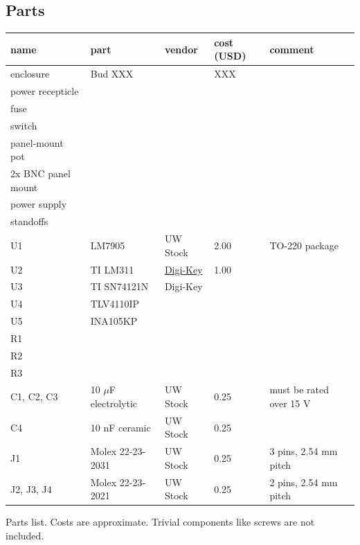 \documentclass{manual}
\begin{document}
\clearpage
\subsection{Parts}

\begin{table}[h]
\begin{tabular}{ l | l | l | l | l }
  name & part & vendor & cost (USD) & comment \\ \hline
  enclosure & Bud XXX & & XXX & \\
  power recepticle & & & & \\
  fuse & & & & \\
  switch & & & & \\
  panel-mount pot & & & & \\
  2x BNC panel mount & & & & \\ \hline
  power supply & & & & \\
  standoffs & & & & \\ \hline
  U1 & LM7905 & UW Stock & 2.00 & TO-220 package \\
  U2 & TI LM311 & \href{https://www.digikey.com/product-detail/en/texas-instruments/LM311N-NOPB/LM311NNS-NOPB-ND/6175}{Digi-Key} & 1.00 & \\
  U3 & TI SN74121N & Digi-Key & & \\
  U4 & TLV4110IP & & & \\
  U5 & INA105KP & & & \\ \hline
  R1 & & & \\
  R2 & & & \\
  R3 & & & \\ \hline
  C1, C2, C3 & 10 $\mu$F electrolytic & UW Stock & 0.25 & must be rated over 15 V\\
  C4 & 10 nF ceramic & UW Stock & 0.25 & \\ \hline
  J1 & Molex 22-23-2031 & UW Stock & 0.25 & 3 pins, 2.54 mm pitch \\
  J2, J3, J4 & Molex 22-23-2021 & UW Stock & 0.25 & 2 pins, 2.54 mm pitch \\
\end{tabular}
\end{table}

Parts list.
Costs are approximate.
Trivial components like screws are not included.





\end{document}
